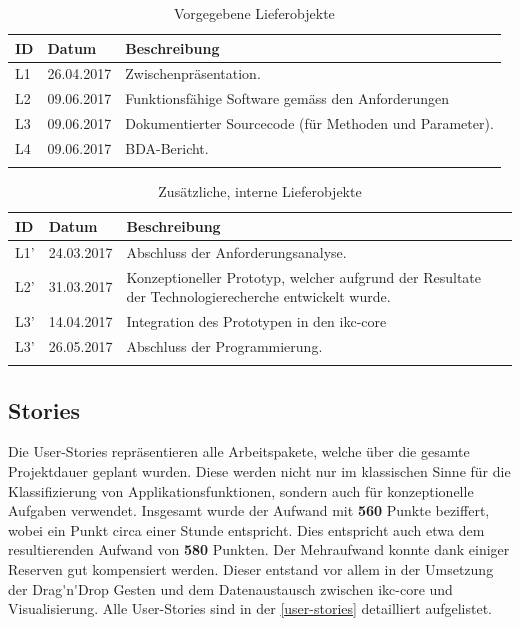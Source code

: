 \begin{longtable}{|p{1cm} | p{2cm} | p{8.1cm}|}
  \hline
    ID & Datum &  Beschreibung \\\hline
    L1 & 26.04.2017 & Zwischenpräsentation.\\\hline
    L2 & 09.06.2017 & Funktionsfähige Software gemäss den Anforderungen
    \\\hline
    L3 & 09.06.2017 & Dokumentierter Sourcecode (für Methoden und Parameter).\\\hline
    L4 & 09.06.2017 & \gls{BDA}-Bericht.\\\hline
    \caption{Vorgegebene Lieferobjekte}
  \label{tab:set-lieferobjekte}
\end{longtable}
 
\begin{longtable}{|p{1cm} | p{2cm} | p{8.1cm}|}
  \hline
    ID & Datum &  Beschreibung \\\hline
    L1' & 24.03.2017 & Abschluss der Anforderungsanalyse.\\\hline
    L2' & 31.03.2017 & Konzeptioneller Prototyp, welcher aufgrund der Resultate der Technologierecherche entwickelt wurde.\\\hline
    L3' & 14.04.2017 & Integration des Prototypen in den \gls{ikc-core}\\\hline
    L3' & 26.05.2017 & Abschluss der Programmierung.\\\hline
    \caption{Zusätzliche, interne Lieferobjekte}
  \label{tab:add-lieferobjekte}
\end{longtable}



\subsection{Stories}
Die User-Stories repräsentieren alle Arbeitspakete, welche über die gesamte Projektdauer geplant wurden. Diese werden nicht nur im klassischen Sinne für die Klassifizierung von Applikationsfunktionen, sondern auch für konzeptionelle Aufgaben verwendet. Insgesamt wurde der Aufwand mit \textbf{560} Punkte beziffert, wobei ein Punkt circa einer Stunde entspricht. Dies entspricht auch etwa dem resultierenden Aufwand von \textbf{580} Punkten. Der Mehraufwand konnte dank einiger Reserven gut kompensiert werden. Dieser entstand vor allem in der Umsetzung der \gls{Drag'n'Drop} Gesten und dem Datenaustausch zwischen \gls{ikc-core} und Visualisierung. Alle User-Stories sind in der \autoref{user-stories} detailliert aufgelistet.

